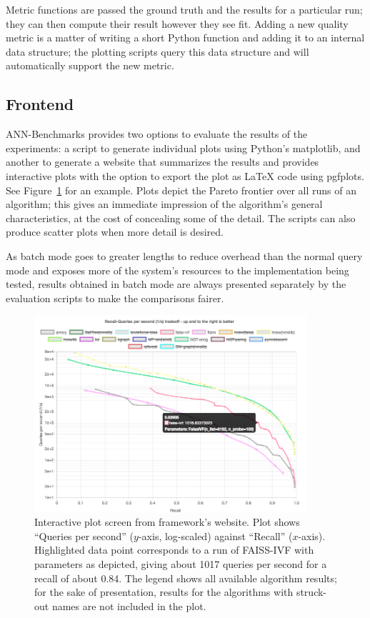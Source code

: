 Metric functions are passed the ground truth and the results for a particular
run; they can then compute their result however they see fit. Adding a new
quality metric is a matter of writing a short Python function and adding it to
an internal data structure; the plotting scripts query this data structure and
will automatically support the new metric.

\subsection{Frontend}\label{sec:frontend}

\textsf{ANN-Benchmarks} provides two options to evaluate the results of the experiments: a script to generate individual plots using Python's \textsf{matplotlib}, and another to generate a website that summarizes the results and provides interactive plots with the option to export the plot as {\LaTeX} code using \textsf{pgfplots}. See Figure~\ref{fig:interactive:plot} for an example. Plots depict the Pareto frontier over all runs of an algorithm; this gives an
immediate impression of the algorithm's general characteristics, at the cost of
concealing some of the detail. The scripts can also produce scatter plots
when more detail is desired.

As batch mode goes to greater lengths to reduce overhead than the normal query
mode and exposes more of the system's resources to the implementation being
tested, results obtained in batch mode are always presented separately by the
evaluation scripts to make the comparisons fairer.

\begin{figure}[t]
\centering
\includegraphics[width=0.9\textwidth]{figures/frontend-plot-uncropped}
\caption{Interactive plot screen from framework's website. 
Plot shows ``Queries per second'' ($y$-axis, log-scaled) against ``Recall'' ($x$-axis). 
Highlighted data point corresponds to a run of \textsf{FAISS-IVF} with parameters 
as depicted, giving about 1017 queries per second for a recall of about 0.84. The legend shows all available 
algorithm results; for the sake of presentation, results for the algorithms
with struck-out names are not included in the plot.}
\label{fig:interactive:plot}
\end{figure}

